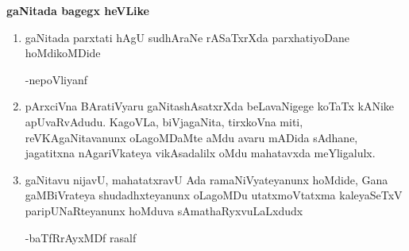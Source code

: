 \begin{center}
{\bf gaNitada bagegx heVLike}
\end{center}

\begin{enumerate}[\rm 1)]
\item gaNitada parxtati hAgU sudhAraNe rASaTxrXda parxhatiyoDane hoMdikoMDide

\hfill{-nepoVliyanf}

\item pArxciVna BAratiVyaru gaNitashAsatxrXda beLavaNigege koTaTx kANike apUvaRvAdudu. KagoVLa, biVjagaNita, tirxkoVna miti, reVKAgaNitavanunx oLagoMDaMte aMdu avaru mADida sAdhane, jagatitxna nAgariVkateya vikAsadalilx oMdu mahatavxda meYligalulx.

\item gaNitavu nijavU, mahatatxravU Ada ramaNiVyateyanunx hoMdide, Gana gaMBiVrateya shudadhxteyanunx oLagoMDu utatxmoVtatxma kaleyaSeTxV paripUNaR\-teyanunx hoMduva sAmathaRyxvuLaLxdudx 

\hfill{-baTfRrAyxMDf rasalf}
\end{enumerate}
